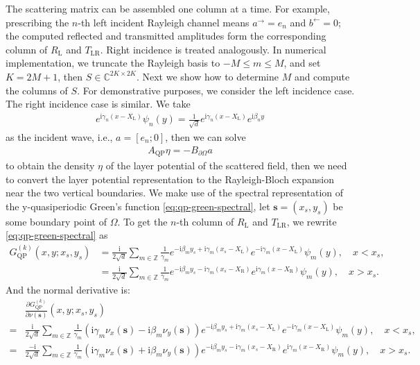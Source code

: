 \documentclass[11pt,fleqn]{article}
\newcommand{\ii}{\mathrm{i}}
\theoremstyle{definition}
\theoremstyle{remark}
\begin{document}
The scattering matrix can be assembled one column at a time. For example, prescribing the \(n\)-th left incident Rayleigh channel means \(a^\rightarrow=e_n\) and \(b^\leftarrow=0\); the computed reflected and transmitted amplitudes form the corresponding column of \(R_\mathrm{L}\) and \(T_{\mathrm{LR}}\). Right incidence is treated analogously.
In numerical implementation, we truncate the Rayleigh basis to \(-M\leq m\leq M\), and set \(K=2M+1\), then $S \in \mathbb{C}^{2K\times 2K}$. Next we show how to determine $M$ and compute the columns of $S$. For demonstrative purposes, we consider the left incidence case. The right incidence case is similar. We take \begin{align*}
  e^{\ii \gamma_n (x - X_\mathrm{L})} \psi_n(y) = \frac{1}{\sqrt{d}} e^{\ii \gamma_n (x - X_\mathrm{L})} e^{\ii \beta_n y}
\end{align*}
as the incident wave, i.e., $a = [e_n; 0]$, then we can solve \begin{align*}
  A_\mathrm{QP}\eta = -B_{\partial \Omega} a
\end{align*}
to obtain the density $\eta$ of the layer potential of the scattered field, then we need 
to convert the layer potential representation to the Rayleigh-Bloch expansion near the 
two vertical boundaries. We make use of the spectral representation of the y-quasiperiodic Green's function \eqref{eq:qp-green-spectral},
let $\mathbf{s} = (x_s, y_s)$ be some boundary point of $\Omega$. To get the $n$-th column of $R_\mathrm{L}$ and $T_{\mathrm{LR}}$, we rewrite \eqref{eq:qp-green-spectral} as \begin{align*}
  G_\mathrm{QP}^{(k)}(x,y;x_s,y_s) &= \frac{\ii}{2\sqrt{d}} \sum_{m\in\mathbb{Z}} \frac{1}{\gamma_m} e^{-\ii \beta_m y_s + \ii \gamma_m (x_s - X_\mathrm{L})} e^{-\ii \gamma_m (x - X_\mathrm{L})} \psi_m(y),\quad x < x_s,\\
  &= \frac{\ii}{2\sqrt{d}} \sum_{m\in\mathbb{Z}} \frac{1}{\gamma_m} e^{-\ii \beta_m y_s - \ii \gamma_m (x_s - X_\mathrm{R})} e^{\ii \gamma_m (x - X_\mathrm{R})} \psi_m(y),\quad x > x_s.
\end{align*}
And the normal derivative is: \begin{align*}
  &\frac{\partial G_\mathrm{QP}^{(k)}}{\partial \nu(\mathbf{s})}(x,y;x_s,y_s) \\
  ={}& \frac{\ii}{2\sqrt{d}} \sum_{m\in\mathbb{Z}} \frac{1}{\gamma_m} (\ii \gamma_m \nu_x(\mathbf{s}) - \ii \beta_m \nu_y(\mathbf{s})) e^{-\ii \beta_m y_s + \ii \gamma_m (x_s - X_\mathrm{L})} e^{-\ii \gamma_m (x - X_\mathrm{L})} \psi_m(y),\quad x < x_s,\\
  ={}& \frac{-\ii}{2\sqrt{d}} \sum_{m\in\mathbb{Z}} \frac{1}{\gamma_m} (\ii \gamma_m \nu_x(\mathbf{s}) + \ii \beta_m \nu_y(\mathbf{s})) e^{-\ii \beta_m y_s - \ii \gamma_m (x_s - X_\mathrm{R})} e^{\ii \gamma_m (x - X_\mathrm{R})} \psi_m(y) ,\quad x > x_s.
\end{align*}
\end{document}
